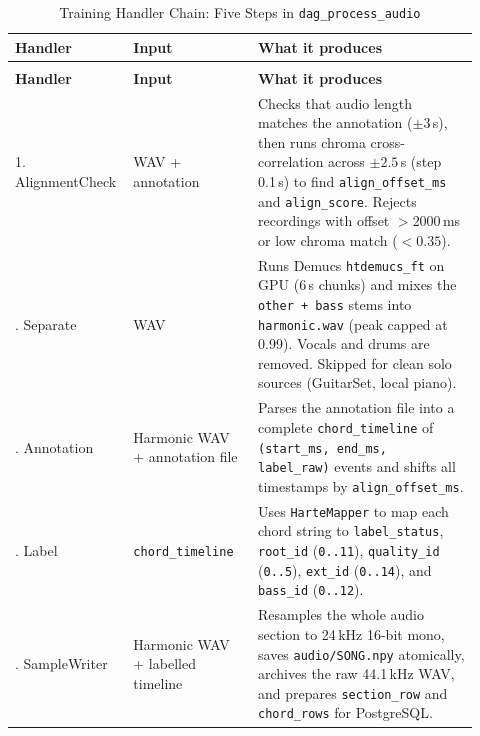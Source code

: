 \documentclass[a4paper]{article}
\begin{document}
\begin{longtable}{@{}
    >{\raggedright\arraybackslash}p{0.20\linewidth}
    >{\raggedright\arraybackslash}p{0.26\linewidth}
    >{\raggedright\arraybackslash}p{0.46\linewidth}@{}}

    \caption{Training Handler Chain: Five Steps in \texttt{dag\_process\_audio}}\label{tab:handlers} \\
    \toprule
    \textbf{Handler} & \textbf{Input} & \textbf{What it produces} \\
    \midrule
    \endfirsthead
    \multicolumn{3}{l}{\footnotesize\itshape (Table~\ref{tab:handlers} continued)}\\
    \toprule
    \textbf{Handler} & \textbf{Input} & \textbf{What it produces} \\
    \midrule
    \endhead
    \bottomrule
    \endlastfoot

    1. AlignmentCheck & WAV + annotation & Checks that audio length matches the annotation ($\pm 3$\,s), then runs chroma cross-correlation across $\pm 2.5$\,s (step 0.1\,s) to find \texttt{align\_offset\_ms} and \texttt{align\_score}. Rejects recordings with offset $>2000$\,ms or low chroma match ($<0.35$). \\
    \addlinespace
    2. Separate & WAV & Runs Demucs \texttt{htdemucs\_ft} on GPU (6\,s chunks) and mixes the \texttt{other + bass} stems into \texttt{harmonic.wav} (peak capped at 0.99). Vocals and drums are removed. Skipped for clean solo sources (GuitarSet, local piano). \\
    \addlinespace
    3. Annotation & Harmonic WAV + annotation file & Parses the annotation file into a complete \texttt{chord\_timeline} of \texttt{(start\_ms, end\_ms, label\_raw)} events and shifts all timestamps by \texttt{align\_offset\_ms}. \\
    \addlinespace
    4. Label & \texttt{chord\_timeline} & Uses \texttt{HarteMapper} to map each chord string to \texttt{label\_status}, \texttt{root\_id} (\texttt{0..11}), \texttt{quality\_id} (\texttt{0..5}), \texttt{ext\_id} (\texttt{0..14}), and \texttt{bass\_id} (\texttt{0..12}). \\
    \addlinespace
    5. SampleWriter & Harmonic WAV + labelled timeline & Resamples the whole audio section to 24\,kHz 16-bit mono, saves \texttt{audio/SONG.npy} atomically, archives the raw 44.1\,kHz WAV, and prepares \texttt{section\_row} and \texttt{chord\_rows} for PostgreSQL. \\
\end{longtable}
\end{document}
